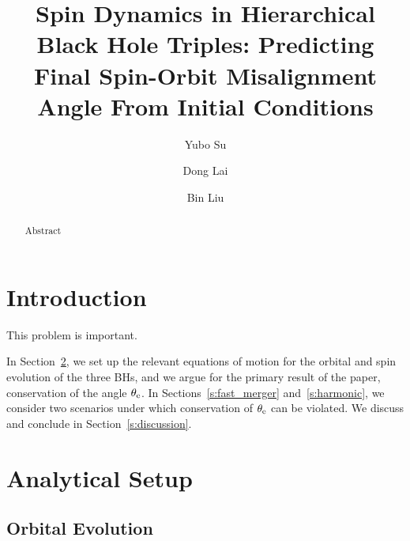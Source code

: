 \documentclass[
        twocolumn,
        twocolappendix
    ]{aastex63}
\begin{document}
\title{Spin Dynamics in Hierarchical Black Hole Triples: Predicting Final
Spin-Orbit Misalignment Angle From Initial Conditions}


\author[0000-0001-8283-3425]{Yubo Su}%

\author[0000-0002-1934-6250]{Dong Lai}%

\author{Bin Liu}

\begin{abstract}
    Abstract
\end{abstract}


\section{Introduction}\label{s:intro}

This problem is important.

In Section~\ref{s:setup}, we set up the relevant equations of motion for the
orbital and spin evolution of the three BHs, and we argue for the primary result
of the paper, conservation of the angle $\theta_{\rm e}$. In
Sections~\ref{s:fast_merger} and~\ref{s:harmonic}, we consider two scenarios
under which conservation of $\theta_{\rm e}$ can be violated. We discuss and
conclude in Section~\ref{s:discussion}.

\section{Analytical Setup}\label{s:setup}

\subsection{Orbital Evolution}
\end{document}

